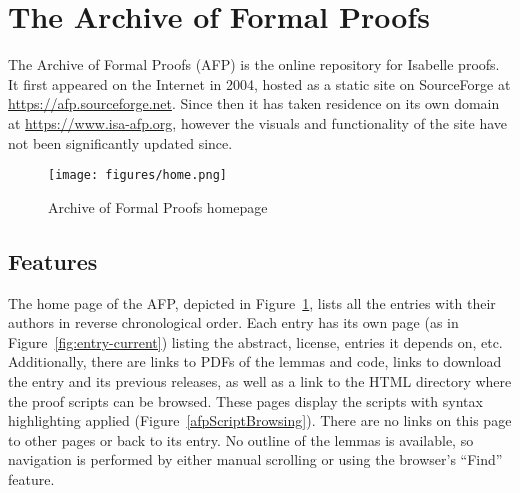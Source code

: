 \documentclass[bsc,frontabs,oneside,singlespacing,parskip,deptreport,logo]{infthesis}
\begin{document}


\section{The Archive of Formal Proofs} \label{afp-background}

The Archive of Formal Proofs (AFP) is the online repository for Isabelle proofs. It first appeared on the Internet in 2004, hosted as a static site on SourceForge at \url{https://afp.sourceforge.net}. Since then it has taken residence on its own domain at \url{https://www.isa-afp.org}, however the visuals and functionality of the site have not been significantly updated since.


\begin{figure}[h]
    \centering
    \texttt{[image: figures/home.png]}
    \caption{Archive of Formal Proofs homepage}
    \label{afpHomePage}
\end{figure}

\subsection{Features} \label{afpFeatures}

The home page of the AFP, depicted in Figure~\ref{afpHomePage}, lists all the entries with their authors in reverse chronological order. Each entry has its own page (as in Figure~\ref{fig:entry-current}) listing the abstract, license, entries it depends on, etc. Additionally, there are links to PDFs of the lemmas and code, links to download the entry and its previous releases, as well as a link to the HTML directory where the proof scripts can be browsed. These pages display the scripts with syntax highlighting applied (Figure~\ref{afpScriptBrowsing}). There are no links on this page to other pages or back to its entry. No outline of the lemmas is available, so navigation is performed by either manual scrolling or using the browser's ``Find'' feature. 
\end{document}
